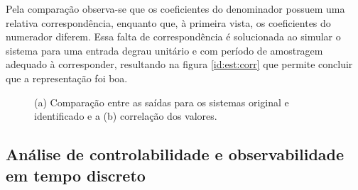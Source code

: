 Pela comparação observa-se que os coeficientes do denominador possuem uma relativa correspondência, enquanto que, à primeira vista, os coeficientes do numerador diferem. Essa falta de correspondência é solucionada ao simular o sistema para uma entrada degrau unitário e com período de amostragem adequado à corresponder, resultando na figura \ref{id:est:corr} que permite concluir que a representação foi boa.

\begin{figure}[H]
\begin{center}
\end{center}
\caption{(a) Comparação entre as saídas para os sistemas original e identificado e a (b) correlação dos valores.}
\label{id:ins:corr} 
\end{figure}


\subsection{Análise de controlabilidade e observabilidade em tempo discreto}

